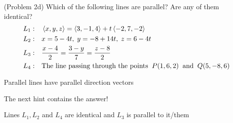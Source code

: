 \documentclass[handout]{ximera}
\begin{document}
\begin{problem}(Problem 2d)
Which of the following lines are parallel? Are any of them identical?
\begin{align*}
L_1:&\quad \left\langle x, y, z\right\rangle = \left\langle 3,-1,4\right\rangle + t\left\langle -2,7,-2\right\rangle\\
L_2:& \quad x = 5-4t,\; y = -8+ 14t,\; z = 6-4t\\
L_3:& \quad \frac{x - 4 }{2} = \frac{3 -y}{7}= \frac{z - 8}{2}\\
L_4:&\quad  \text{The line passing through the points} \;\; P(1, 6, 2)\;\; \text{and} \;\; Q(5, -8, 6)
\end{align*}
\begin{hint}
Parallel lines have parallel direction vectors
\end{hint}
\begin{hint}
The next hint contains the answer!
\end{hint}
\begin{hint}
Lines $L_1, L_2$ and $L_4$ are identical and $L_3$ is parallel to it/them
\end{hint}
\end{problem}
\end{document}

